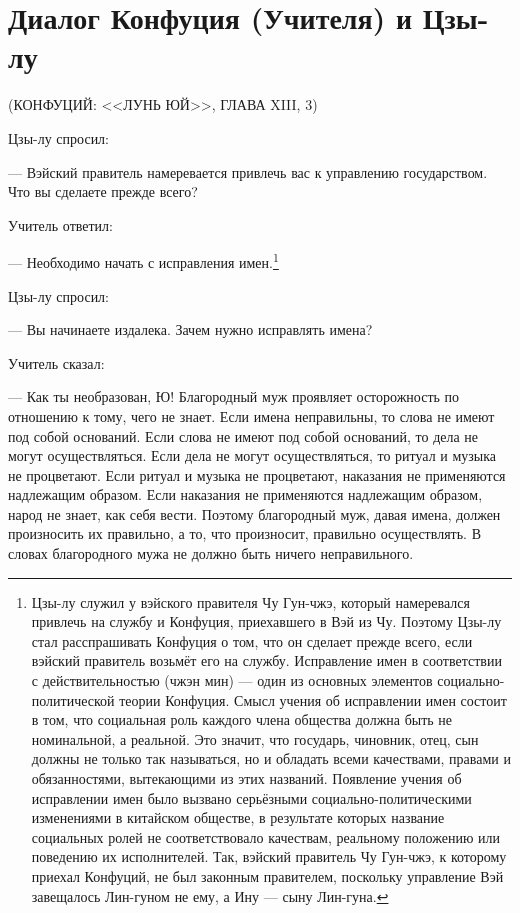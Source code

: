 \chapter*{Диалог Конфуция (Учителя) и Цзы-лу}
\begin{flushright}
\normalsize(КОНФУЦИЙ: <<ЛУНЬ ЮЙ>>, ГЛАВА XIII, 3) 
\end{flushright} 

Цзы-лу спросил: 

— Вэйский правитель намеревается привлечь вас к управлению государством. Что вы
сделаете прежде всего? 

Учитель ответил:

— Необходимо начать с исправления имен.\footnote{%
Цзы-лу служил у вэйского правителя Чу Гун-чжэ, который намеревался привлечь на службу и Конфуция, приехавшего в Вэй из Чу. Поэтому Цзы-лу стал расспрашивать Конфуция о том, что он сделает прежде всего, если вэйский правитель возьмёт его на службу. Исправление имен в соответствии с действительностью (чжэн мин) — один из основных элементов социально-политической теории Конфуция. Смысл учения об исправлении имен состоит в том, что социальная роль каждого члена общества должна быть не номинальной, а реальной. Это значит, что государь, чиновник, отец, сын должны не только так называться, но и обладать всеми качествами, правами и обязанностями, вытекающими из этих названий. Появление учения об исправлении имен было вызвано серьёзными социально-политическими изменениями в китайском обществе, в результате которых название социальных ролей не соответствовало качествам, реальному положению или поведению их исполнителей. Так, вэйский правитель Чу Гун-чжэ, к которому приехал Конфуций, не был законным правителем, поскольку управление Вэй завещалось Лин-гуном не ему, а Ину — сыну Лин-гуна.}

Цзы-лу спросил:

— Вы начинаете издалека. Зачем нужно исправлять имена?

Учитель сказал:

— Как ты необразован, Ю! Благородный муж проявляет осторожность по отношению к тому, чего не знает. Если имена неправильны, то слова не имеют под собой оснований. Если слова не имеют под собой оснований, то дела не могут осуществляться. Если дела не могут осуществляться, то ритуал и музыка не процветают. Если ритуал и музыка не процветают, наказания не применяются надлежащим образом. Если наказания не применяются надлежащим образом, народ не знает, как себя вести. Поэтому благородный муж, давая имена, должен произносить их правильно, а то, что произносит, правильно осуществлять. В словах благородного мужа не должно быть ничего неправильного.

